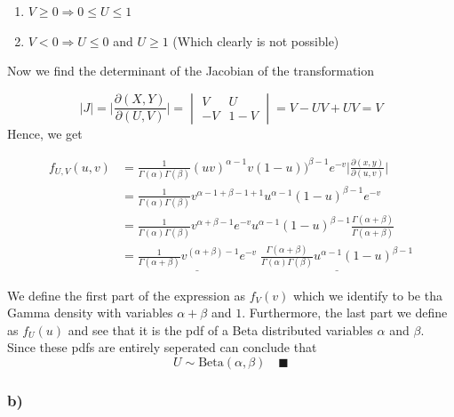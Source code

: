 \documentclass[
]{article}
\newenvironment{Shaded}{\begin{snugshade}}{\end{snugshade}}
\newcommand{\ControlFlowTok}[1]{\textcolor[rgb]{0.13,0.29,0.53}{\textbf{#1}}}
\newcommand{\FunctionTok}[1]{\textcolor[rgb]{0.00,0.00,0.00}{#1}}
\newcommand{\NormalTok}[1]{#1}
\newcommand{\OtherTok}[1]{\textcolor[rgb]{0.56,0.35,0.01}{#1}}
\newcommand{\SpecialCharTok}[1]{\textcolor[rgb]{0.00,0.00,0.00}{#1}}
\providecommand{\tightlist}{%
  \setlength{\itemsep}{0pt}\setlength{\parskip}{0pt}}
\begin{document}
\begin{enumerate}
\def\labelenumi{\arabic{enumi}.}
\tightlist
\item
  \(V ≥ 0 \Rightarrow 0 ≤ U ≤ 1\)
\item
  \(V < 0 \Rightarrow U ≤ 0\) and \(U ≥ 1\) (Which clearly is not
  possible)
\end{enumerate}

Now we find the determinant of the Jacobian of the transformation

\[
|J| = \Bigg|\frac{\partial(X,Y)}{\partial(U, V)}\Bigg| 
= \begin{vmatrix}
V & U \\
-V & 1-V
\end{vmatrix} = V - UV + UV = V
\] Hence, we get

\begin{align*}
f_{U, V}(u, v) &= \frac{1}{\Gamma(\alpha)\Gamma(\beta)}(uv)^{\alpha-1}v(1-u))^{\beta-1}e^{-v} \Bigg|\frac{\partial(x, y)}{\partial(u, v)}\Bigg| \\
&= \frac{1}{\Gamma(\alpha)\Gamma(\beta)}v^{\alpha-1+\beta-1+1} u^{\alpha-1}(1-u)^{\beta-1}e^{-v} \\
&= \frac{1}{\Gamma(\alpha)\Gamma(\beta)}v^{\alpha+\beta-1}e^{-v} u^{\alpha-1}(1-u)^{\beta-1} \frac{\Gamma(\alpha + \beta)}{\Gamma(\alpha + \beta)} \\
&= \underline{\frac{1}{\Gamma(\alpha + \beta)}v^{(\alpha + \beta) - 1}e^{-v}} \;
\underline{\frac{\Gamma(\alpha + \beta)}{\Gamma(\alpha)\Gamma(\beta)} u^{\alpha-1}(1-u)^{\beta-1}}
\end{align*}

We define the first part of the expression as \(f_V(v)\) which we
identify to be tha Gamma density with variables \(\alpha + \beta\) and
\(1\). Furthermore, the last part we define as \(f_U(u)\) and see that
it is the pdf of a Beta distributed variables \(\alpha\) and \(\beta\).
Since these pdfs are entirely seperated can conclude that \[
U \sim \text{Beta}(\alpha, \beta) \quad \blacksquare
\]

\hypertarget{b-2}{%
\subsubsection{b)}\label{b-2}}

\begin{Shaded}
\end{Shaded}
\end{document}
